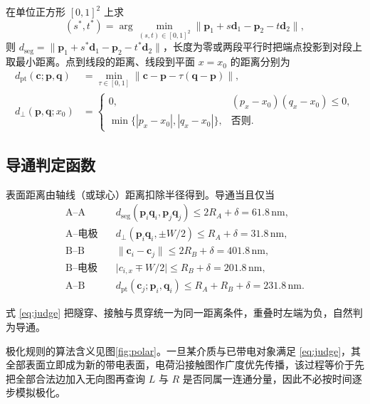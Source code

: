 \documentclass[UTF8,a4paper,zihao=-4,fontset=none]{ctexart}
\begin{document}
在单位正方形 $[0,1]^2$ 上求
\begin{equation}
(s^*,t^*)=\arg\min_{(s,t)\in[0,1]^2}
\bigl\|\boldsymbol{p}_1+s\boldsymbol{d}_1-\boldsymbol{p}_2-t\boldsymbol{d}_2\bigr\|,
\label{eq:st}
\end{equation}
则 $d_{\mathrm{seg}}=\|\boldsymbol{p}_1+s^*\boldsymbol{d}_1-\boldsymbol{p}_2-t^*\boldsymbol{d}_2\|$，长度为零或两段平行时把端点投影到对段上取最小距离。点到线段的距离、线段到平面 $x=x_0$ 的距离分别为
\begin{align}
d_{\mathrm{pt}}(\boldsymbol{c};\boldsymbol{p},\boldsymbol{q})
&=\min_{\tau\in[0,1]}\|\boldsymbol{c}-\boldsymbol{p}-\tau(\boldsymbol{q}-\boldsymbol{p})\|,\\
d_{\perp}(\boldsymbol{p},\boldsymbol{q};x_0)
&=
\begin{cases}
0, & (p_x-x_0)(q_x-x_0)\le 0,\\
\min\bigl\{|p_x-x_0|,|q_x-x_0|\bigr\}, & \text{否则.}
\end{cases}
\label{eq:dplane}
\end{align}

\subsection{导通判定函数}

表面距离由轴线（或球心）距离扣除半径得到。导通当且仅当
\begin{equation}
\begin{aligned}
\text{A--A}&\quad d_{\mathrm{seg}}(\boldsymbol{p}_i\boldsymbol{q}_i,\boldsymbol{p}_j\boldsymbol{q}_j)\le 2R_A+\delta=61.8\,\mathrm{nm},\\
\text{A--电极}&\quad d_{\perp}(\boldsymbol{p}_i\boldsymbol{q}_i,\pm W/2)\le R_A+\delta=31.8\,\mathrm{nm},\\
\text{B--B}&\quad \|\boldsymbol{c}_i-\boldsymbol{c}_j\|\le 2R_B+\delta=401.8\,\mathrm{nm},\\
\text{B--电极}&\quad \bigl|c_{i,x}\mp W/2\bigr|\le R_B+\delta=201.8\,\mathrm{nm},\\
\text{A--B}&\quad d_{\mathrm{pt}}(\boldsymbol{c}_j;\boldsymbol{p}_i,\boldsymbol{q}_i)\le R_A+R_B+\delta=231.8\,\mathrm{nm}.
\end{aligned}
\label{eq:judge}
\end{equation}

式 \eqref{eq:judge} 把隧穿、接触与贯穿统一为同一距离条件，重叠时左端为负，自然判为导通。

极化规则的算法含义见图\ref{fig:polar}。一旦某介质与已带电对象满足 \eqref{eq:judge}，其全部表面立即成为新的带电表面，电荷沿接触图作广度优先传播，该过程等价于先把全部合法边加入无向图再查询 $L$ 与 $R$ 是否同属一连通分量，因此不必按时间逐步模拟极化。
\end{document}
